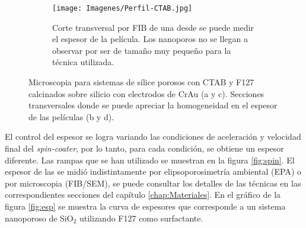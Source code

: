 \begin{figure}[th]
\begin{subfigure}[t]{0.49\textwidth}
			       		\label{fig:sem_homogeneidad3}
			       		\end{subfigure}
					\begin{subfigure}[t]{0.49\textwidth}
			 	   	    \texttt{[image: Imagenes/Perfil-CTAB.jpg]}
			       		\caption{Corte transversal por FIB de una \pdmC\space desde se puede medir el espesor de la película. Los nanoporos no se llegan a observar por ser de tamaño muy pequeño para la técnica utilizada.}
			       		\label{fig:sem_homogeneidad4}
			       		\end{subfigure}	
					 \caption[MEB \pdmC\space y \pdmF.]{Microscopia para sistemas de sílice porosos con CTAB y F127 calcinados sobre silicio con electrodos de Cr\textbar Au (a y c). Secciones transversales donde se puede apreciar la homogeneidad en el espesor de las películas (b y d).}
					 \label{fig:sem_homogeneidad}	
				     \vspace*{0.2cm}
				     \end{figure}

		El control del espesor se logra variando las condiciones de aceleración y velocidad final del \textit{spin-coater}, por lo tanto, para cada condición, se obtiene un espesor diferente. Las rampas que se han utilizado se muestran en la figura \ref{fig:spin}. El espesor de las \pdm\space se midió indistintamente por elipsoporosimetría ambiental (EPA) o por microscopia (FIB/SEM), se puede consultar los detalles de las técnicas en las correspondientes secciones del capítulo \ref{chap:Materiales}. En el gráfico de la figura \ref{fig:esp} se muestra la curva de espesores que corresponde a un sistema nanoporoso de SiO$_2$ utilizando F127 como surfactante. 

